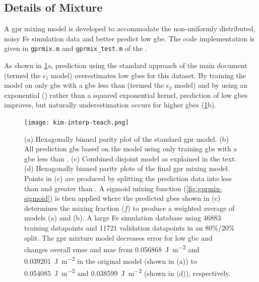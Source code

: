 \documentclass[preprint,12pt]{elsarticle}
\begin{document}
\subsection{Details of  Mixture}
\label{sec:supp:kim-interp:method}

A \gls{gpr} mixing model is developed to accommodate the non-uniformly distributed, noisy Fe simulation data \cite{kimPhasefieldModeling3D2014} and better predict low \gls{gbe}. The code implementation is given in \texttt{gprmix.m} and \texttt{gprmix\_test.m} of the \vfzorepo{} \cite{bairdFiveDegreeofFreedom5DOF2020}.

As shown in \cref{fig:kim-interp-teach}a, prediction using the standard approach of the main document (termed the $\epsilon_1$ model) overestimates low \glspl{gbe} for this dataset. By training the model on only \glspl{gb} with a \gls{gbe} less than \thrtwo{} (termed the $\epsilon_2$ model) and by using an exponential () rather than a squared exponential kernel, prediction of low \glspl{gbe} improves, but naturally underestimation occurs for higher \glspl{gbe} (\cref{fig:kim-interp-teach}b).

\begin{figure}
    \centering
    \texttt{[image: kim-interp-teach.png]}
    \caption{(a) Hexagonally binned parity plot of the standard \gls{gpr} model. (b) All prediction \glspl{gb} based on the model using only training \glspl{gb} with a \gls{gbe} less than \thrtwo{}. (c) Combined disjoint model as explained in the text. (d) Hexagonally binned parity plots of the final \gls{gpr} mixing model. Points in (c) are produced by splitting the prediction data into less than and greater than \thr{}. A sigmoid mixing function (\cref{fig:gprmix-sigmoid}) is then applied where the predicted \glspl{gbe} shown in (c) determines the mixing fraction ($f$) to produce a weighted average of models (a) and (b). A large Fe simulation database \cite{kimPhasefieldModeling3D2014} using \num{46883} training datapoints and \num{11721} validation datapoints in an 80\%/20\% split. The \gls{gpr} mixture model decreases error for low \gls{gbe} and changes overall \gls{rmse} and \gls{mae} from \SI{0.056868}{\J\per\square\meter} and \SI{0.039201}{\J\per\square\meter} in the original model (shown in (a)) to \SI{0.054085}{\J\per\square\meter} and \SI{0.038599}{\J\per\square\meter} (shown in (d)), respectively.}
    \label{fig:kim-interp-teach}
\end{figure}
\end{document}
